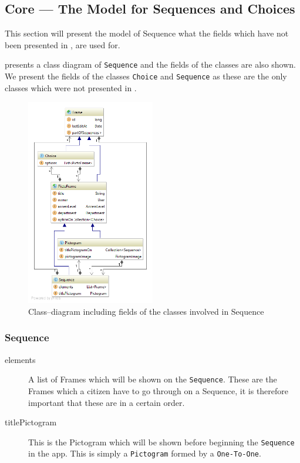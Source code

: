 \subsection{Core --- The Model for Sequences and Choices}

This section will present the model of Sequence what the fields which have not been presented in , are used for.

 presents a class diagram of \texttt{Sequence} and the fields of the classes are also shown.
We present the fields of the classes \texttt{Choice} and \texttt{Sequence} as these are the only classes which were not presented in .

\begin{figure}[h]
    \centering
    \includegraphics[width=0.5\textwidth]{figures/diagram-sequence-with-fields.png}
    \caption{Class--diagram including fields of the classes involved in Sequence}\label{fig:sequencemodel}
\end{figure}


\subsubsection{Sequence}
\begin{description}
	\item[elements] A list of Frames which will be shown on the \texttt{Sequence}.
	These are the Frames which a citizen have to go through on a Sequence, it is therefore important that these are in a certain order.
	\item[titlePictogram] This is the Pictogram which will be shown before beginning the \texttt{Sequence} in the app.
	This is simply a \texttt{Pictogram} formed by a \texttt{One-To-One}.
\end{description}

